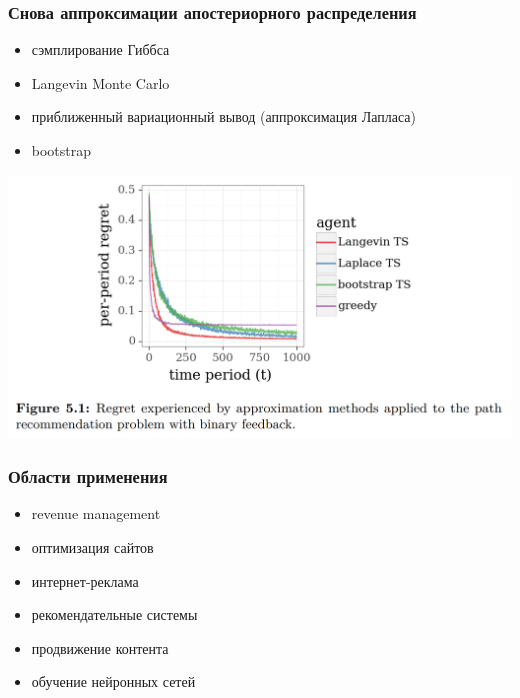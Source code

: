 \documentclass[fullscreen=true, bookmarks=true, hyperref={pdfencoding=unicode}]{beamer}
\begin{document}
\begin{frame}
  \frametitle{Снова аппроксимации апостериорного распределения}

  \begin{itemize}
    \item сэмплирование Гиббса
    \item Langevin Monte Carlo
    \item приближенный вариационный вывод (аппроксимация Лапласа)
    \item bootstrap
  \end{itemize}

  \begin{center}
    \includegraphics[keepaspectratio,
                     width=.7\paperwidth]{tompson_sampling.png}
  \end{center}
\end{frame}


\begin{frame}
  \frametitle{Области применения}

  \begin{itemize}
    \item revenue management
    \item оптимизация сайтов
    \item интернет-реклама
    \item рекомендательные системы
    \item продвижение контента
    \item обучение нейронных сетей
  \end{itemize}
\end{frame}
\end{document}
